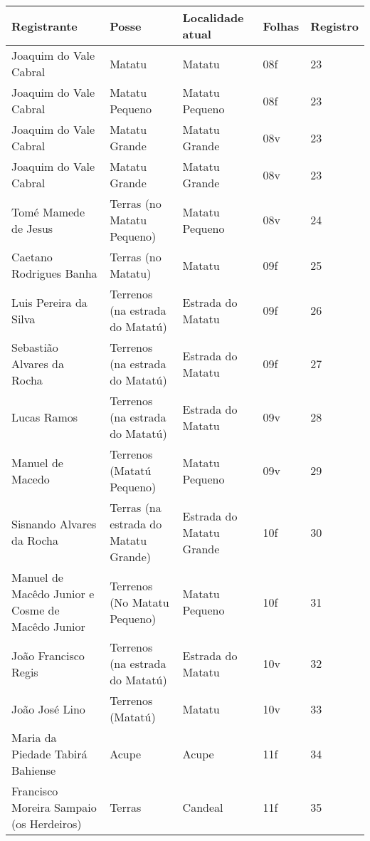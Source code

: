 \begin{table}
{
\begin{minipage}{\textwidth}
\begin{tiny}
\begin{tabular}{p{4cm}p{4cm}p{4cm}ll}
\toprule
Registrante									&Posse					&Localidade atual			&Folhas			&Registro		\\
\midrule
\midrule
Joaquim do Vale Cabral								&Matatu					&Matatu					&08f			&23			\\
Joaquim do Vale Cabral								&Matatu Pequeno				&Matatu Pequeno				&08f			&23			\\
Joaquim do Vale Cabral								&Matatu Grande				&Matatu Grande				&08v			&23			\\
Joaquim do Vale Cabral								&Matatu Grande				&Matatu Grande				&08v			&23			\\
Tomé Mamede de Jesus								&Terras (no Matatu Pequeno)		&Matatu Pequeno				&08v			&24			\\
Caetano Rodrigues Banha								&Terras (no Matatu)			&Matatu					&09f			&25			\\
Luis Pereira da Silva								&Terrenos (na estrada do Matatú)	&Estrada do Matatu			&09f			&26			\\
Sebastião Alvares da Rocha							&Terrenos (na estrada do Matatú)	&Estrada do Matatu			&09f			&27			\\
Lucas Ramos									&Terrenos (na estrada do Matatú)	&Estrada do Matatu			&09v			&28			\\
Manuel de Macedo								&Terrenos (Matatú Pequeno)		&Matatu Pequeno				&09v			&29			\\
Sisnando Alvares da Rocha							&Terras (na estrada do Matatu Grande)	&Estrada do Matatu Grande		&10f			&30			\\
Manuel de Macêdo Junior e Cosme de Macêdo Junior				&Terrenos (No Matatu Pequeno)		&Matatu Pequeno				&10f			&31			\\
João Francisco Regis								&Terrenos (na estrada do Matatú)	&Estrada do Matatu			&10v			&32			\\
João José Lino									&Terrenos (Matatú)			&Matatu					&10v			&33			\\
Maria da Piedade Tabirá Bahiense						&Acupe					&Acupe					&11f			&34			\\
Francisco Moreira Sampaio (os Herdeiros)					&Terras					&Candeal				&11f			&35			\\

\end{tabular}
\end{tiny}
\end{minipage}}
\end{table}
